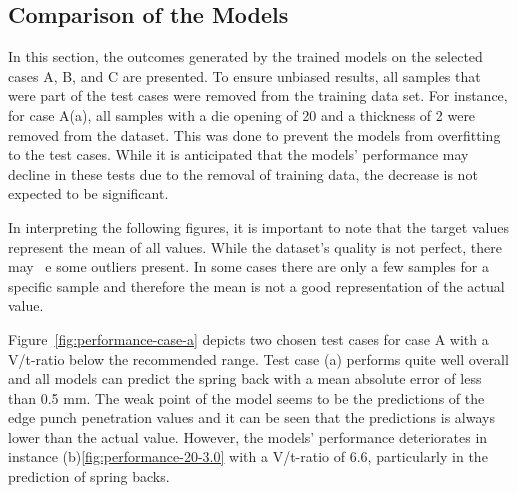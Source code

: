 \subsection{Comparison of the Models}\label{subsec:overall-comparison-model-performance}
In this section, the outcomes generated by the trained models on the selected cases A, B, and C are presented. To
ensure unbiased results, all samples that were part of the test cases were removed from the training data set.
For instance, for case A(a), all samples with a die opening of 20 and a thickness of 2 were removed from the dataset.
This was done to prevent the models from overfitting to the test cases.
While it is anticipated that the models' performance may decline in these tests due to the removal of training data,
the decrease is not expected to be significant.

In interpreting the following figures, it is important to note that the target values represent the mean of all
values.
While the dataset's quality is not perfect, there may \ e some outliers present. In some cases there are only a few
samples for a specific sample and therefore the mean is not a good representation of the actual value.

Figure~\ref{fig:performance-case-a} depicts two chosen test cases for case A with a V/t-ratio below the recommended
range.
Test case (a) performs quite well overall and all models can predict the spring back with a mean absolute error of
less than 0.5 mm.
The weak point of the model seems to be the predictions of the edge punch penetration values and it can be seen that
the predictions is always lower than the actual value.
However, the models' performance deteriorates in instance (b)\ref{fig:performance-20-3.0} with a V/t-ratio of 6.6,
particularly in the prediction of spring backs.

